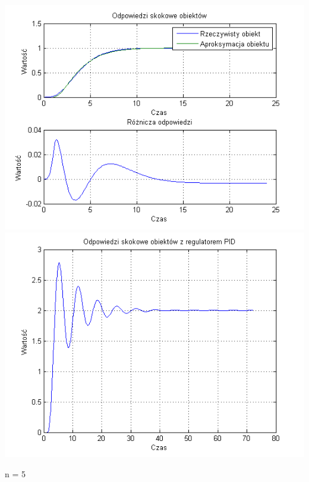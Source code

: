 \documentclass[10pt,a4paper]{article}
\begin{document}
\begin{center}
\includegraphics[scale=1]{images/dwa/skrypt_107.png}\\
\includegraphics[scale=1]{images/dwa/skrypt_108.png}\\
\end{center}
\newpage
n = 5
\end{document}
